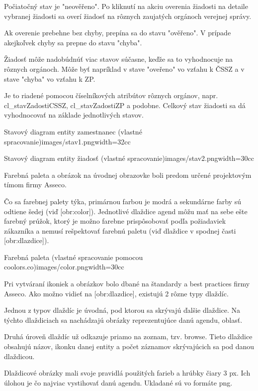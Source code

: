 Počiatočný stav je "neověřeno". Po kliknutí na akciu overenia žiadosti na detaile vybranej žiadosti sa overí žiadosť na rôznych zaujatých orgánoch verejnej správy. 

Ak overenie prebehne bez chyby, prepína sa do stavu "ověřeno". V prípade akejkoľvek chyby sa prepne do stavu "chyba". 

Žiadosť môže nadobúdnúť viac stavov súčasne, keďže sa to vyhodnocuje na rôznych orgánoch. Môže byť napríklad v stave "oveřeno" vo vzťahu k ČSSZ a v stave "chyba" vo vzťahu k ZP. 

Je to riadené pomocou číselníkových atribútov rôznych orgánov, napr. cl_stavZadostiCSSZ, cl_stavZadostiZP a podobne. Celkový stav žiadosti sa dá vyhodnocovať na základe jednotlivých stavov. 


{Stavový diagram entity zamestnanec (vlastné spracovanie)}{images/stav1.png}{width=32cc} 


{Stavový diagram entity žiadosť (vlastné spracovanie)}{images/stav2.png}{width=30cc} 

Farebná paleta a obrázok na úvodnej obrazovke boli predom určené projektovým tímom firmy Asseco.

Čo sa farebnej palety týka, primárnou farbou je modrá a sekundárne farby sú odtiene šedej (viď [obr:color]). Jednotlivé dlaždice agend môžu mať na sebe ešte farebný prúžok, ktorý je možno farebne prispôsobovať podľa požiadaviek zákazníka a nemusí rešpektovať farebnú paletu (viď dlaždice v spodnej časti [obr:dlazdice]).

{Farebná paleta (vlastné spracovanie pomocou coolors.co)}{images/color.png}{width=30cc} 

Pri vytváraní ikoniek a obrázkov bolo dbané na štandardy a best practices firmy Asseco. Ako možno vidieť na [obr:dlazdice], existujú 2 rôzne typy dlaždíc. 

Jednou z typov dlaždíc je úvodná, pod ktorou sa skrývajú ďalšie dlaždice. Na týchto dlaždiciach sa nachádzajú obrázky reprezentujúce danú agendu, oblasť. 

Druhá úroveň dlaždíc už odkazuje priamo na zoznam, tzv. browse. Tieto dlaždice obsahujú názov, ikonku danej entity a počet záznamov skrývajúcich sa pod danou dlaždicou. 

Dlaždicové obrázky mali svoje pravidlá použitých farieb a hrúbky čiary 3 px. Ich úlohou je čo najviac vystihovať danú agendu. Ukladané sú vo formáte png. 

